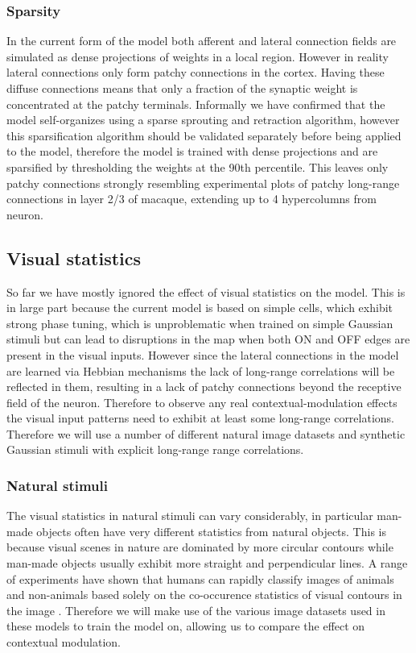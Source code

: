 \subsubsection{Sparsity}

In the current form of the model both afferent and lateral connection
fields are simulated as dense projections of weights in a local
region. However in reality lateral connections only form patchy
connections in the cortex. Having these diffuse connections means that
only a fraction of the synaptic weight is concentrated at the patchy
terminals. Informally we have confirmed that the model self-organizes
using a sparse sprouting and retraction algorithm, however this
sparsification algorithm should be validated separately before being
applied to the model, therefore the model is trained with dense
projections and are sparsified by thresholding the weights at the 90th
percentile. This leaves only patchy connections strongly resembling
experimental plots of patchy long-range connections in layer 2/3 of
macaque, extending up to 4 hypercolumns from neuron.

\subsection{Visual statistics}

So far we have mostly ignored the effect of visual statistics on the
model. This is in large part because the current model is based on
simple cells, which exhibit strong phase tuning, which is
unproblematic when trained on simple Gaussian stimuli but can lead to
disruptions in the map when both ON and OFF edges are present in the
visual inputs. However since the lateral connections in the model are
learned via Hebbian mechanisms the lack of long-range correlations
will be reflected in them, resulting in a lack of patchy connections
beyond the receptive field of the neuron. Therefore to observe any
real contextual-modulation effects the visual input patterns need to
exhibit at least some long-range correlations. Therefore we will use a
number of different natural image datasets and synthetic Gaussian
stimuli with explicit long-range range correlations.

\subsubsection{Natural stimuli}

The visual statistics in natural stimuli can vary considerably, in
particular man-made objects often have very different statistics from
natural objects. This is because visual scenes in nature are dominated
by more circular contours while man-made objects usually exhibit more
straight and perpendicular lines. A range of experiments have shown
that humans can rapidly classify images of animals and non-animals
based solely on the co-occurence statistics of visual contours in the
image \citep{Serre2007, Perrinet2015}. Therefore we will make use of
the various image datasets used in these models to train the model on,
allowing us to compare the effect on contextual modulation.

